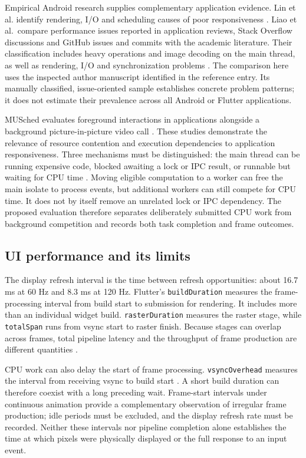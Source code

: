 \documentclass[14pt,a4paper,oneside]{extreport}
\begin{document}
Empirical Android research supplies complementary application evidence. Lin et al.
identify rendering, I/O and scheduling causes of poor responsiveness \citep{lin2024}.
Liao et al.~compare performance issues reported in application reviews, Stack Overflow
discussions and GitHub issues and commits with the academic literature. Their classification
includes heavy operations and image decoding on the main thread, as well as rendering,
I/O and synchronization problems \citep[Table~1]{liao2026performance}. The comparison here
uses the inspected author manuscript identified in the reference entry. Its manually
classified, issue-oriented sample establishes concrete problem patterns; it does not estimate
their prevalence across all Android or Flutter applications.

MUSched evaluates foreground interactions in applications alongside a background
picture-in-picture video call \citep[Table~3]{musched2026}. These studies demonstrate the
relevance of resource contention and execution dependencies to application responsiveness.
Three mechanisms must be distinguished: the main thread can be running expensive code,
blocked awaiting a lock or IPC result, or runnable but waiting for CPU time
\citep[Secs. 2--3, 6]{musched2026}. Moving eligible computation to a worker can free the
main isolate to process events, but additional workers can still compete for CPU time.
It does not by itself remove an unrelated lock or IPC dependency. The proposed evaluation
therefore separates deliberately submitted CPU work from background competition and records
both task completion and frame outcomes.

\subsection{UI performance and its limits}
\label{ui-performance-and-its-limits}

The display refresh interval is the time between refresh opportunities: about 16.7 ms at 60 Hz
and 8.3 ms at 120 Hz. Flutter's \texttt{buildDuration} measures the frame-processing interval from
build start to submission for rendering. It includes more than an individual widget build.
\texttt{rasterDuration} measures the raster stage, while \texttt{totalSpan} runs from vsync
start to raster finish. Because stages can overlap across frames, total pipeline latency and
the throughput of frame production are different quantities
\citep{flutter-frame, flutter-build}.

CPU work can also delay the start of frame processing. \texttt{vsyncOverhead} measures the
interval from receiving vsync to build start \citep{flutter-vsync}. A short build duration can
therefore coexist with a long preceding wait. Frame-start intervals under continuous animation
provide a complementary observation of irregular frame production; idle periods must be
excluded, and the display refresh rate must be recorded. Neither these intervals nor pipeline
completion alone establishes the time at which pixels were physically displayed or the full
response to an input event.
\end{document}
